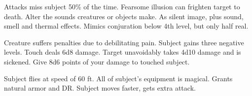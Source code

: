 \begin{swspelllist}
   Attacks miss subject 50\% of the time.
   Fearsome illusion can frighten target to death.
   Alter the sounds creatures or objects make.
   As silent image, plus sound, smell and thermal effects.
   Mimics conjuration below 4th level, but only half real.

   Creature suffers penalties due to debilitating pain.
   Subject gains three negative levels.
   Touch deals 6d8 damage.
   Target unavoidably takes 4d10 damage and is sickened.
   Give 8d6 points of your damage to touched subject.

   Subject flies at speed of 60 ft.
   All of subject's equipment is magical.
   Grants natural armor and DR.
   Subject moves faster, gets extra attack.
  \spellheadrestricted{}
\end{swspelllist}

